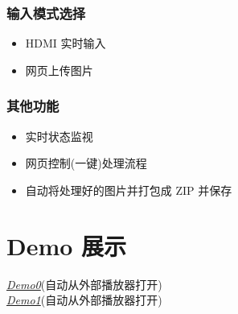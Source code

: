 \documentclass[12pt, a4paper, oneside]{ctexbook}
\begin{document}
    \newpage
    \subsection{输入模式选择}
    \begin{itemize}
        \item HDMI 实时输入
        \item 网页上传图片
    \end{itemize}
    \subsection{其他功能}
    \begin{itemize}
        \item 实时状态监视
        \item 网页控制(一键)处理流程
        \item 自动将处理好的图片并打包成 ZIP 并保存
    \end{itemize}

	\chapter{Demo 展示}
	\href{file:./video/demo0.mp4}{\huge{\textit{Demo0}}}(自动从外部播放器打开) \\
	
	\href{file:./video/demo1.mp4}{\huge{\textit{Demo1}}}(自动从外部播放器打开) \\

    
	
\end{document}

